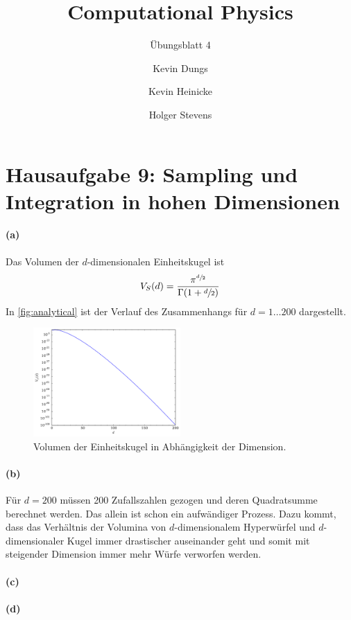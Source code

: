 \documentclass{scrartcl}
\author{Kevin Dungs \and Kevin Heinicke \and Holger Stevens}
\title{Computational Physics}
\subtitle{Übungsblatt 4}
\begin{document}
\maketitle

\section*{Hausaufgabe 9: Sampling und Integration in hohen Dimensionen}
\paragraph{(a)} Das Volumen der $d$-dimensionalen Einheitskugel ist
\begin{equation}
    V_S(d) = \frac{\pi^{\sfrac{d}{2}}}{\Gamma(1 + \sfrac{d}{2})}
\end{equation}
In \autoref{fig:analytical} ist der Verlauf des Zusammenhangs für $d=1\dots200$ dargestellt.

\begin{figure}[H]
    \centering
    \includegraphics[width=0.5\textwidth]{plots/analytical.pdf}
    \caption{Volumen der Einheitskugel in Abhängigkeit der Dimension.}
    \label{fig:analytical}
\end{figure}

\paragraph{(b)} Für $d=200$ müssen \num{200} Zufallszahlen gezogen und deren Quadratsumme berechnet werden. Das allein ist schon ein aufwändiger Prozess. Dazu kommt, dass das Verhältnis der Volumina von $d$-dimensionalem Hyperwürfel und $d$-dimensionaler Kugel immer drastischer auseinander geht und somit mit steigender Dimension immer mehr Würfe verworfen werden.

\paragraph{(c)}
\paragraph{(d)}
\end{document}

